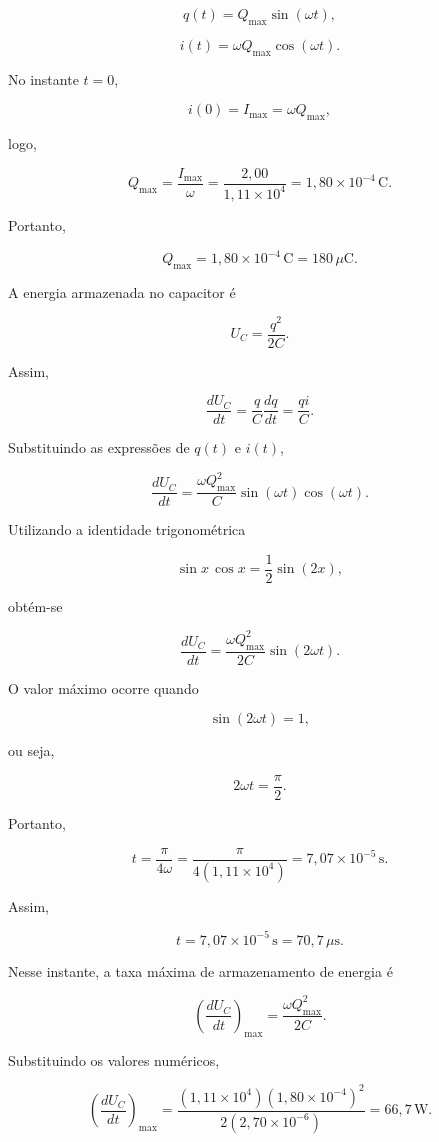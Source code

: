 \documentclass[12pt,a4paper]{article}
\begin{document}
\[
q(t)=Q_{\max}\sin(\omega t),
\]

\[
i(t)=\omega Q_{\max}\cos(\omega t).
\]

No instante \(t=0\),

\[
i(0)=I_{\max}=\omega Q_{\max},
\]

logo,

\[
Q_{\max}
=
\frac{I_{\max}}{\omega}
=
\frac{2,00}{1,11\times10^{4}}
=
1,80\times10^{-4}\,\mathrm{C}.
\]

Portanto,

\[
\boxed{Q_{\max}=1,80\times10^{-4}\,\mathrm{C}
=180\,\mu\mathrm{C}}.
\]

A energia armazenada no capacitor é

\[
U_C=\frac{q^2}{2C}.
\]

Assim,

\[
\frac{dU_C}{dt}
=
\frac{q}{C}\frac{dq}{dt}
=
\frac{qi}{C}.
\]

Substituindo as expressões de \(q(t)\) e \(i(t)\),

\[
\frac{dU_C}{dt}
=
\frac{\omega Q_{\max}^{2}}{C}
\sin(\omega t)\cos(\omega t).
\]

Utilizando a identidade trigonométrica

\[
\sin x\,\cos x
=
\frac{1}{2}\sin(2x),
\]

obtém-se

\[
\frac{dU_C}{dt}
=
\frac{\omega Q_{\max}^{2}}{2C}
\sin(2\omega t).
\]

O valor máximo ocorre quando

\[
\sin(2\omega t)=1,
\]

ou seja,

\[
2\omega t=\frac{\pi}{2}.
\]

Portanto,

\[
t
=
\frac{\pi}{4\omega}
=
\frac{\pi}{4(1,11\times10^{4})}
=
7,07\times10^{-5}\,\mathrm{s}.
\]

Assim,

\[
\boxed{
t=7,07\times10^{-5}\,\mathrm{s}
=
70,7\,\mu\mathrm{s}
}.
\]

Nesse instante, a taxa máxima de armazenamento de energia é

\[
\left(\frac{dU_C}{dt}\right)_{\max}
=
\frac{\omega Q_{\max}^{2}}{2C}.
\]

Substituindo os valores numéricos,

\[
\left(\frac{dU_C}{dt}\right)_{\max}
=
\frac{(1,11\times10^{4})
      (1,80\times10^{-4})^{2}}
           {2(2,70\times10^{-6})}
           =
           66,7\,\mathrm{W}.
           \]
\end{document}
